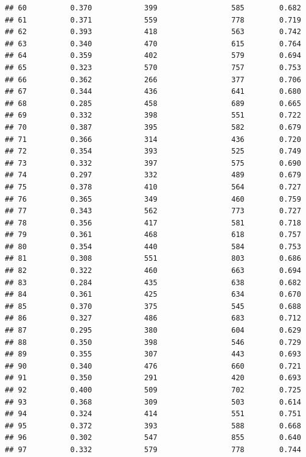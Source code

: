 \documentclass[]{book}
\begin{document}
\begin{verbatim}
## 60          0.370            399                 585        0.682
## 61          0.371            559                 778        0.719
## 62          0.393            418                 563        0.742
## 63          0.340            470                 615        0.764
## 64          0.359            402                 579        0.694
## 65          0.323            570                 757        0.753
## 66          0.362            266                 377        0.706
## 67          0.344            436                 641        0.680
## 68          0.285            458                 689        0.665
## 69          0.332            398                 551        0.722
## 70          0.387            395                 582        0.679
## 71          0.366            314                 436        0.720
## 72          0.354            393                 525        0.749
## 73          0.332            397                 575        0.690
## 74          0.297            332                 489        0.679
## 75          0.378            410                 564        0.727
## 76          0.365            349                 460        0.759
## 77          0.343            562                 773        0.727
## 78          0.356            417                 581        0.718
## 79          0.361            468                 618        0.757
## 80          0.354            440                 584        0.753
## 81          0.308            551                 803        0.686
## 82          0.322            460                 663        0.694
## 83          0.284            435                 638        0.682
## 84          0.361            425                 634        0.670
## 85          0.370            375                 545        0.688
## 86          0.327            486                 683        0.712
## 87          0.295            380                 604        0.629
## 88          0.350            398                 546        0.729
## 89          0.355            307                 443        0.693
## 90          0.340            476                 660        0.721
## 91          0.350            291                 420        0.693
## 92          0.400            509                 702        0.725
## 93          0.368            309                 503        0.614
## 94          0.324            414                 551        0.751
## 95          0.372            393                 588        0.668
## 96          0.302            547                 855        0.640
## 97          0.332            579                 778        0.744

\end{verbatim}
\end{document}
